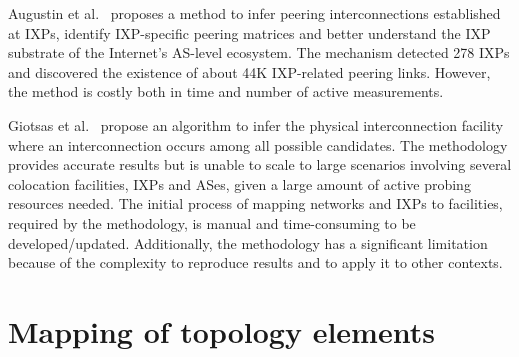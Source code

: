 	Augustin et al.~\cite{Augustin:2009:IM:1644893.1644934} proposes a method to infer peering interconnections established at IXPs, identify IXP-specific peering matrices and better understand the IXP substrate of the Internet’s AS-level ecosystem. The mechanism detected 278 IXPs and discovered the existence of about 44K IXP-related peering links. However, the method is costly both in time and number of active measurements. 

	Giotsas et al.~\cite{Giotsas:2015:MPI:2716281.2836122} propose an algorithm to infer the physical interconnection facility where an interconnection occurs among all possible candidates. The methodology provides accurate results but is unable to scale to large scenarios involving several colocation facilities, IXPs and ASes, given a large amount of active probing resources needed. The initial process of mapping networks and IXPs to facilities, required by the methodology, is manual and time-consuming to be developed/updated. Additionally, the methodology has a significant limitation because of the complexity to reproduce results and to apply it to other contexts.

	
	

	\section{Mapping of topology elements}
	\label{sec:rel-work-mapping-topo-elem}


